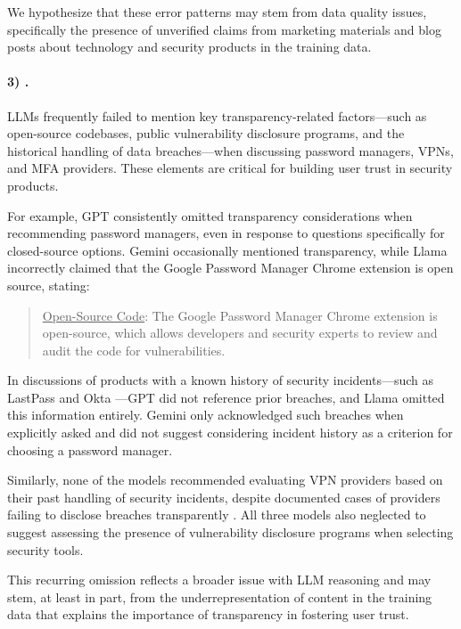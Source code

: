     We hypothesize that these error patterns may stem from data quality issues, specifically the presence of unverified claims from marketing materials and blog posts about technology and security products in the training data.

    \paragraph{3) \TransparencyArguments.} LLMs frequently failed to mention key transparency-related factors—such as open-source codebases, public vulnerability disclosure programs, and the historical handling of data breaches—when discussing password managers, VPNs, and MFA providers. These elements are critical for building user trust in security products.

    For example, GPT consistently omitted transparency considerations when recommending password managers, even in response to questions specifically for closed-source options. Gemini occasionally mentioned transparency, while Llama incorrectly claimed that the Google Password Manager Chrome extension is open source, stating:
    \begin{quote}
        \uline{Open-Source Code}: The Google Password Manager Chrome extension is open-source, which allows developers and security experts to review and audit the code for vulnerabilities.
    \end{quote}
    
    In discussions of products with a known history of security incidents—such as LastPass and Okta \cite{lastpass_security_incident-2022-12, lastpass_incident_data-2023-03, lastpass_security_notice_2015, okta_verkada_attack_2021, okta_support_system_unauthorized_access_2023}—GPT did not reference prior breaches, and Llama omitted this information entirely. Gemini only acknowledged such breaches when explicitly asked and did not suggest considering incident history as a criterion for choosing a password manager.
    
    Similarly, none of the models recommended evaluating VPN providers based on their past handling of security incidents, despite documented cases of providers failing to disclose breaches transparently \cite{nordvpn_datacenter_breach_2019}. All three models also neglected to suggest assessing the presence of vulnerability disclosure programs when selecting security tools.
    
    This recurring omission reflects a broader issue with LLM reasoning and may stem, at least in part, from the underrepresentation of content in the training data that explains the importance of transparency in fostering user trust.
    
